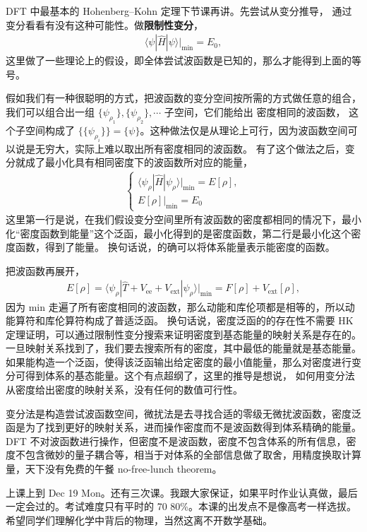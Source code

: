 DFT 中最基本的 Hohenberg--Kohn 定理下节课再讲。先尝试从变分推导，
通过变分看看有没有这种可能性。做\textbf{限制性变分}，
\begin{align}
    \langle \psi | \hat H | \psi \rangle |_{\text{min}} = E_0,
\end{align}
这里做了一些理论上的假设，即全体尝试波函数是已知的，那么才能得到上面的等号。

假如我们有一种很聪明的方式，把波函数的变分空间按所需的方式做任意的组合，我们可以组合出一组 $\{\psi_{\rho_1}\}, \{\psi_{\rho_2}\}, \cdots$ 子空间，它们能给出
密度相同的波函数，
这个子空间构成了 $\big\{\{\psi_{\rho_i}\}\big\} = \{\psi\}$。这种做法仅是从理论上可行，因为波函数空间可以说是无穷大，实际上难以取出所有密度相同的波函数。
有了这个做法之后，变分就成了最小化具有相同密度下的波函数所对应的能量，
\begin{align}
\left\{
\begin{array}{l}
\langle \psi_\rho | \hat H |\psi_\rho \rangle|_\text{min} = E[\rho], \\
E[\rho] | _{\text{min}} = E_0
\end{array}
\right.
\end{align}
这里第一行是说，在我们假设变分空间里所有波函数的密度都相同的情况下，最小化``密度函数到能量''这个泛函，最小化得到的是密度函数，第二行是最小化这个密度函数，得到了能量。
换句话说，的确可以将体系能量表示能密度的函数。


把波函数再展开，
\begin{align}
    E[\rho] = 
\langle    \psi_\rho | \hat T + V_{\mathrm{ee}} + V_{\mathrm{ext}} | \psi_\rho \rangle | _{\text{min}}  
= F[\rho] + V_{\mathrm{ext}}[\rho], 
\end{align}
因为 min 走遍了所有密度相同的波函数，那么动能和库伦项都是相等的，所以动能算符和库伦算符构成了普适泛函。
换句话说，密度泛函的的存在性不需要 HK 定理证明，可以通过限制性变分搜索来证明密度到基态能量的映射关系是存在的。
一旦映射关系找到了，我们要去搜索所有的密度，其中最低的能量就是基态能量。如果能构造一个泛函，使得该泛函输出给定密度的最小值能量，那么对密度进行变分可得到体系的基态能量。这个有点超纲了，这里的推导是想说，
如何用变分法从密度给出密度的映射关系，没有任何的数值可行性。

变分法是构造尝试波函数空间，微扰法是去寻找合适的零级无微扰波函数，密度泛函是为了找到更好的映射关系，进而操作密度而不是波函数得到体系精确的能量。DFT 不对波函数进行操作，但密度不是波函数，密度不包含体系的所有信息，密度不包含微妙的量子耦合等，相当于对体系的全部信息做了取舍，用精度换取计算量，天下没有免费的午餐 no-free-lunch theorem。

上课上到 Dec 19 Mon。还有三次课。我跟大家保证，如果平时作业认真做，最后一定会过的。考试难度只有平时的 70 80\%。本课的出发点不是像高考一样选拔。希望同学们理解化学中背后的物理，当然这离不开数学基础。
